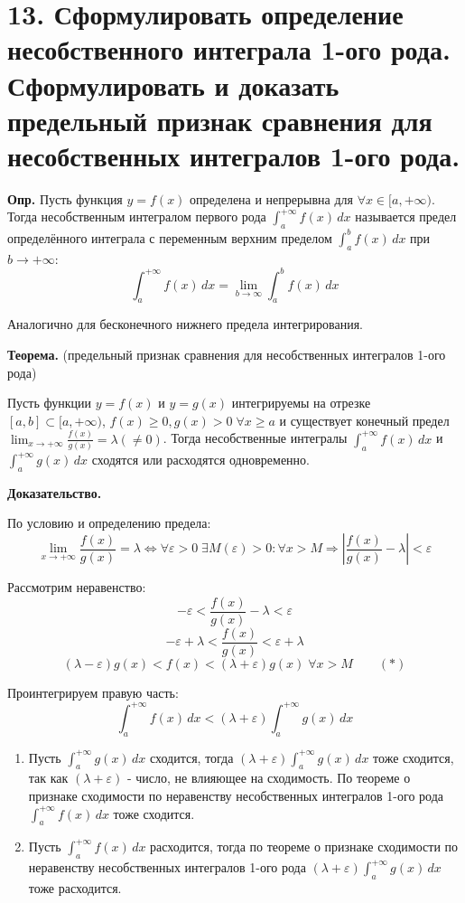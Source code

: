 \documentclass[11pt]{article}
\begin{document}
\section*{13. Сформулировать определение несобственного интеграла 1-ого рода. Сформулировать и доказать предельный признак сравнения для несобственных интегралов 1-ого рода.}
\par\textbf{Опр.} Пусть функция $y = f(x)$ определена и непрерывна для $\forall x \in [a, +\infty)$. Тогда несобственным интегралом первого рода $\int_{a}^{+\infty} f(x) \, dx$ называется предел определённого интеграла с переменным верхним пределом $\int_{a}^{b} f(x) \, dx$ при $b \to +\infty$:$$\int_{a}^{+\infty} f(x) \, dx = \lim_{ b \to \infty}{\int_{a}^b f(x) \, dx }$$
\par Аналогично для бесконечного нижнего предела интегрирования.
\par\textbf{Теорема.} (предельный признак сравнения для несобственных интегралов 1-ого рода)
\par Пусть функции $y = f(x)$ и $y = g(x)$ интегрируемы на отрезке $[a, b] \subset [a, +\infty)$, $f(x) \geq 0, g(x) > 0 \; \forall x \geq a$ и существует конечный предел $\lim_{ x \to +\infty }{\frac{f(x)}{g(x)}} = \lambda (\not = 0)$. Тогда несобственные интегралы $\int_{a}^{+\infty} f(x) \, dx$ и $\int_{a}^{+\infty} g(x) \, dx$ сходятся или расходятся одновременно.
\par\textbf{Доказательство.}
\par По условию и определению предела:$$\lim_{ x \to +\infty }{\frac{f(x)}{g(x)}} = \lambda \iff \forall \varepsilon > 0 \; \exists M(\varepsilon) > 0: \forall x > M \Rightarrow \left| \frac{f(x)}{g(x)} - \lambda \right| < \varepsilon$$
\par Рассмотрим неравенство:
$$- \varepsilon < \frac{f(x)}{g(x)} - \lambda < \varepsilon$$
$$- \varepsilon + \lambda < \frac{f(x)}{g(x)} < \varepsilon + \lambda$$
$$(\lambda - \varepsilon) g(x) < f(x) < (\lambda + \varepsilon) g(x) \; \forall x > M \qquad (*)$$
\par Проинтегрируем правую часть:$$\int_{a}^{+\infty} f(x) \, dx < (\lambda + \varepsilon) \int_{a}^{+\infty} g(x) \, dx$$
\begin{enumerate}
\item Пусть $\int_{a}^{+\infty} g(x) \, dx$ сходится, тогда $(\lambda + \varepsilon) \int_{a}^{+\infty} g(x) \, dx$ тоже сходится, так как $(\lambda + \varepsilon)$ - число, не влияющее на сходимость. По теореме о признаке сходимости по неравенству несобственных интегралов 1-ого рода $\int_{a}^{+\infty} f(x) \, dx$ тоже сходится.
\item Пусть $\int_{a}^{+\infty} f(x) \, dx$ расходится, тогда по теореме о признаке сходимости по неравенству несобственных интегралов 1-ого рода $(\lambda + \varepsilon) \int_{a}^{+\infty} g(x) \, dx$ тоже расходится.
\end{enumerate}
\end{document}
